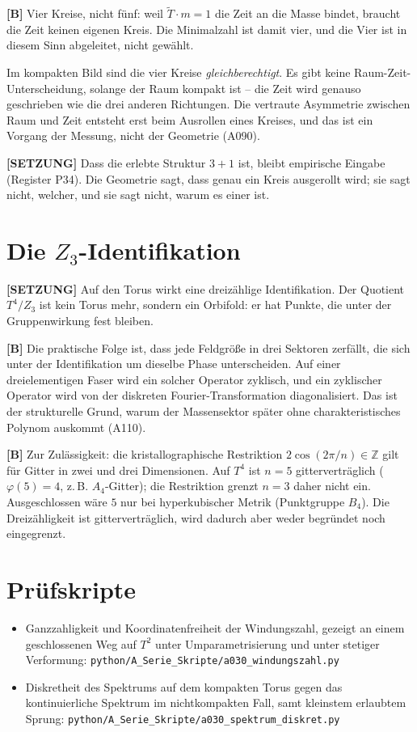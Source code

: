 \textbf{[B]} Vier Kreise, nicht fünf: weil $\tilde T\cdot m = 1$ die Zeit an die
Masse bindet, braucht die Zeit keinen eigenen Kreis. Die Minimalzahl ist damit
vier, und die Vier ist in diesem Sinn abgeleitet, nicht gewählt.

Im kompakten Bild sind die vier Kreise \emph{gleichberechtigt}. Es gibt keine
Raum-Zeit-Unterscheidung, solange der Raum kompakt ist -- die Zeit wird genauso
geschrieben wie die drei anderen Richtungen. Die vertraute Asymmetrie zwischen
Raum und Zeit entsteht erst beim Ausrollen eines Kreises, und das ist ein
Vorgang der Messung, nicht der Geometrie (A090).

\textbf{[SETZUNG]} Dass die erlebte Struktur $3+1$ ist, bleibt empirische
Eingabe (Register P34). Die Geometrie sagt, dass genau ein Kreis ausgerollt
wird; sie sagt nicht, welcher, und sie sagt nicht, warum es einer ist.

\section{Die $Z_3$-Identifikation}

\textbf{[SETZUNG]} Auf den Torus wirkt eine dreizählige Identifikation. Der
Quotient $T^4/Z_3$ ist kein Torus mehr, sondern ein Orbifold: er hat Punkte,
die unter der Gruppenwirkung fest bleiben.

\textbf{[B]} Die praktische Folge ist, dass jede Feldgröße in drei Sektoren
zerfällt, die sich unter der Identifikation um dieselbe Phase unterscheiden.
Auf einer dreielementigen Faser wird ein solcher Operator zyklisch, und ein
zyklischer Operator wird von der diskreten Fourier-Transformation
diagonalisiert. Das ist der strukturelle Grund, warum der Massensektor später
ohne charakteristisches Polynom auskommt (A110).

\textbf{[B]} Zur Zulässigkeit: die kristallographische Restriktion
$2\cos(2\pi/n)\in\mathbb{Z}$ gilt für Gitter in zwei und drei Dimensionen.
Auf $T^4$ ist $n=5$ gitterverträglich ($\varphi(5)=4$, z.\,B.
$A_4$-Gitter); die Restriktion grenzt $n=3$ daher nicht ein. Ausgeschlossen
wäre $5$ nur bei hyperkubischer Metrik (Punktgruppe $B_4$). Die Dreizähligkeit
ist gitterverträglich, wird dadurch aber weder begründet noch eingegrenzt.

\section{Prüfskripte}

\begin{itemize}
  \item Ganzzahligkeit und Koordinatenfreiheit der Windungszahl, gezeigt an
    einem geschlossenen Weg auf $T^2$ unter Umparametrisierung und unter
    stetiger Verformung:
    \texttt{python/A\_Serie\_Skripte/a030\_windungszahl.py}
  \item Diskretheit des Spektrums auf dem kompakten Torus gegen das
    kontinuierliche Spektrum im nichtkompakten Fall, samt kleinstem erlaubtem
    Sprung: \texttt{python/A\_Serie\_Skripte/a030\_spektrum\_diskret.py}
\end{itemize}

